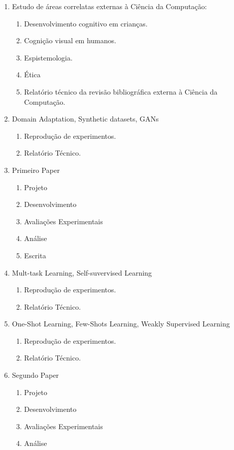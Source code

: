 \documentclass[
12pt, %
a4paper, %
onecolumn, %
]{article}
\begin{document}
\begin{enumerate}
  \item Estudo de áreas correlatas externas à Ciência da Computação:
  \begin{enumerate}
    \item Desenvolvimento cognitivo em crianças.
    \item Cognição visual em humanos.
    \item Espistemologia.
    \item Ética
    \item Relatório técnico da revisão bibliográfica externa à Ciência da Computação.
  \end{enumerate}
  \item Domain Adaptation, Synthetic datasets, GANs
  \begin{enumerate}
    \item Reprodução de experimentos.
    \item Relatório Técnico.
  \end{enumerate}
  \item Primeiro Paper
  \begin{enumerate}
    \item Projeto
    \item Desenvolvimento
    \item Avaliações Experimentais
    \item Análise
    \item Escrita
  \end{enumerate}
  \item Mult-task Learning, Self-suvervised Learning
  \begin{enumerate}
    \item Reprodução de experimentos.
    \item Relatório Técnico.
  \end{enumerate}
  \item One-Shot Learning, Few-Shots Learning, Weakly Supervised Learning
  \begin{enumerate}
    \item Reprodução de experimentos.
    \item Relatório Técnico.
  \end{enumerate}
  \item Segundo Paper
  \begin{enumerate}
    \item Projeto
    \item Desenvolvimento
    \item Avaliações Experimentais
    \item Análise

\end{enumerate}
\end{enumerate}
\end{document}
